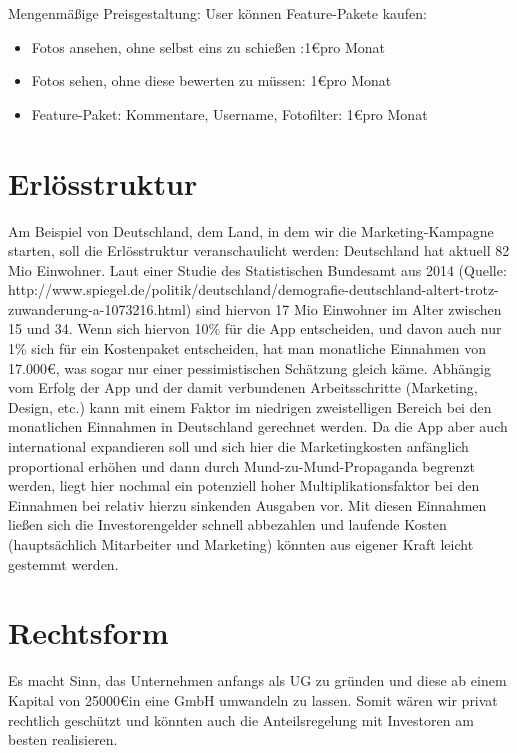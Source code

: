 Mengenmäßige Preisgestaltung: User können Feature-Pakete kaufen:
\begin{itemize}
\item Fotos ansehen, ohne selbst eins zu schießen :1\euro pro Monat
\item Fotos sehen, ohne diese bewerten zu müssen: 1\euro pro Monat
\item Feature-Paket: Kommentare, Username, Fotofilter: 1\euro pro Monat
\end{itemize}


\section{Erlösstruktur}
Am Beispiel von Deutschland, dem Land, in dem wir die Marketing-Kampagne starten, soll die Erlösstruktur veranschaulicht werden:
Deutschland hat aktuell 82 Mio Einwohner. Laut einer Studie des Statistischen Bundesamt aus 2014 (Quelle: http://www.spiegel.de/politik/deutschland/demografie-deutschland-altert-trotz-zuwanderung-a-1073216.html) sind hiervon 17 Mio Einwohner im Alter zwischen 15 und 34. Wenn sich hiervon 10\% für die App entscheiden, und davon auch nur 1\% sich für ein Kostenpaket entscheiden, hat man monatliche Einnahmen von 17.000\euro, was sogar nur einer pessimistischen Schätzung gleich käme. Abhängig vom Erfolg der App und der damit verbundenen Arbeitsschritte (Marketing, Design, etc.) kann mit einem Faktor im niedrigen zweistelligen Bereich bei den monatlichen Einnahmen in Deutschland gerechnet werden. Da die App aber auch international expandieren soll und sich hier die Marketingkosten anfänglich proportional erhöhen und dann durch  Mund-zu-Mund-Propaganda begrenzt werden, liegt hier nochmal ein potenziell hoher Multiplikationsfaktor bei den Einnahmen bei relativ hierzu sinkenden Ausgaben vor. Mit diesen Einnahmen ließen sich die Investorengelder schnell abbezahlen und laufende Kosten (hauptsächlich Mitarbeiter und Marketing) könnten aus eigener Kraft leicht gestemmt werden.


\section{Rechtsform}
Es macht Sinn, das Unternehmen anfangs als UG zu gründen und diese ab einem Kapital von 25000\euro in eine GmbH umwandeln zu lassen. Somit wären wir privat rechtlich geschützt und könnten auch die Anteilsregelung mit Investoren am besten realisieren.

